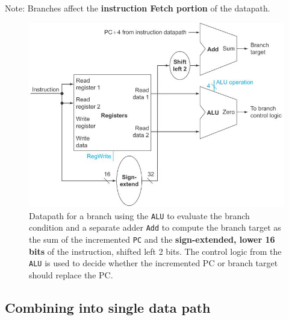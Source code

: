 \documentclass[10pt,a4paper]{article}
\begin{document}
Note: Branches affect the \textbf{instruction Fetch portion} of the datapath.
\begin{figure} [h!]
    \centering
    \includegraphics[scale=0.7]{Branch.JPG}
    \caption{Datapath for a branch using the \texttt{ALU} to evaluate the branch condition and 
    a separate adder \texttt{Add} to compute the branch target as the sum of the incremented
    \texttt{PC} and the \textbf{sign-extended, lower 16 bits} of the instruction, shifted left 2
    bits. The control logic from the \texttt{ALU} is used to decide whether the incremented PC or branch target should replace the PC.}
\end{figure} 

\pagebreak
\subsection{Combining into single data path}
\end{document}
